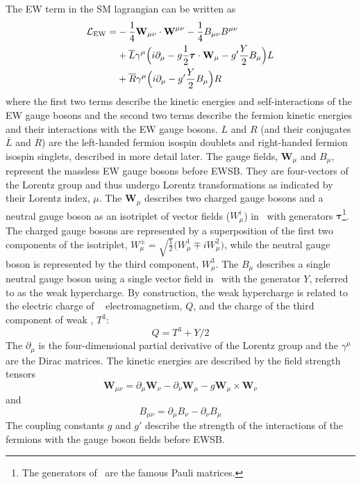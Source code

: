 The EW term in the SM lagrangian can be written as
\begin{equation}
\begin{aligned}
\mathcal{L}_{\textrm{EW}} = &-\frac{1}{4}\textbf{W}_{\mu\nu} \cdot \textbf{W}^{\mu\nu} 
- \frac{1}{4} B_{\mu\nu} B^{\mu\nu}  \\
&+\overline{L}\gamma^{\mu}\Big( i \partial_{\mu} - g \frac{1}{2} \boldsymbol{\tau} \cdot \textbf{W}_{\mu} - g' \frac{Y}{2} B_{\mu} \Big) L \\
&+ \overline{R} \gamma^{\mu} \Big( i \partial_{\mu} - g' \frac{Y}{2} B_{\mu} \Big) R
\end{aligned}
\label{eq:lagrangian_ew}
\end{equation}
where the first two terms describe the kinetic energies and 
self-interactions of the EW gauge bosons
and the second two terms describe the fermion kinetic energies
and their interactions with the EW gauge bosons.
$L$ and $R$ (and their conjugates $\overline{L}$ and $\overline{R}$)
are the left-handed fermion isospin doublets and right-handed
fermion isospin singlets, described in more detail later.
The gauge fields, $\mathbf{W}_{\mu}$ and $B_{\mu}$, represent the 
massless EW gauge bosons before EWSB. They are four-vectors of the Lorentz group
and thus undergo Lorentz transformations as indicated by their Lorentz index, $\mu$.
The $\mathbf{W}_{\mu}$ describes two charged gauge bosons and 
a neutral gauge boson as an isotriplet of 
vector fields ($W_{\mu}^i$)
in \sutwo~with generators
$\boldsymbol{\tau}$\footnote{The generators of \sutwo~are the famous
Pauli matrices.}.
The charged gauge bosons are represented by a superposition of the first
two components of the 
isotriplet, $W_{\mu}^{\pm}=\sqrt{\frac{1}{2}}\Big(W_{\mu}^1\mp i W_{\mu}^2\Big)$,
while the neutral gauge boson is represented 
by the third component, $W_{\mu}^3$.
The $B_{\mu}$ describes a single neutral gauge boson 
using a single vector field in \uone~with the generator $Y$, referred
to as the weak hypercharge.
By construction, the weak hypercharge is related to
the electric charge of \uone~
electromagnetism, $Q$, 
and the charge of the third component of weak \sutwo, $T^3$:
\begin{equation}
Q=T^3+Y/2
\label{eq:ewcharges}
\end{equation}
The $\partial_{\mu}$ is the four-dimensional partial derivative of the Lorentz
group and the $\gamma^{\mu}$ are the Dirac matrices.
The kinetic energies are described by the field strength tensors
\begin{equation}
\label{eq:wfieldstrength}
\textbf{W}_{\mu\nu} = \partial_{\mu}\textbf{W}_{\nu} - \partial_{\nu}\textbf{W}_{\mu} - g \textbf{W}_{\mu}\times \textbf{W}_{\nu}
\end{equation}
and 
\begin{equation}
B_{\mu\nu} = \partial_{\mu} B_{\nu} - \partial_{\nu} B_{\mu}
\end{equation}
The coupling constants $g$ and $g'$ describe the strength of the interactions
of the fermions with the gauge boson fields before EWSB. 

